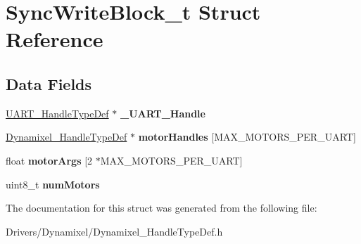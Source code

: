 \hypertarget{struct_sync_write_block__t}{}\section{Sync\+Write\+Block\+\_\+t Struct Reference}
\label{struct_sync_write_block__t}
\subsection*{Data Fields}
\begin{DoxyCompactItemize}
\item 
\mbox{\label{struct_sync_write_block__t_aefc481817957faca32bb883a5a497603}} 
\mbox{\hyperlink{struct_u_a_r_t___handle_type_def}{U\+A\+R\+T\+\_\+\+Handle\+Type\+Def}} $\ast$ {\bfseries \+\_\+\+U\+A\+R\+T\+\_\+\+Handle}
\item 
\mbox{\label{struct_sync_write_block__t_aa48823d437bc0d8271d8c0b0807179ce}} 
\mbox{\hyperlink{struct_dynamixel___handle_type_def}{Dynamixel\+\_\+\+Handle\+Type\+Def}} $\ast$ {\bfseries motor\+Handles} \mbox{[}M\+A\+X\+\_\+\+M\+O\+T\+O\+R\+S\+\_\+\+P\+E\+R\+\_\+\+U\+A\+RT\mbox{]}
\item 
\mbox{\label{struct_sync_write_block__t_ae5ac115617f1b7301176c8d847126031}} 
float {\bfseries motor\+Args} \mbox{[}2 $\ast$M\+A\+X\+\_\+\+M\+O\+T\+O\+R\+S\+\_\+\+P\+E\+R\+\_\+\+U\+A\+RT\mbox{]}
\item 
\mbox{\label{struct_sync_write_block__t_ac074fbecc86b400e568f4c546d9b4d2d}} 
uint8\+\_\+t {\bfseries num\+Motors}
\end{DoxyCompactItemize}


The documentation for this struct was generated from the following file\+:\begin{DoxyCompactItemize}
\item 
Drivers/\+Dynamixel/Dynamixel\+\_\+\+Handle\+Type\+Def.\+h\end{DoxyCompactItemize}
